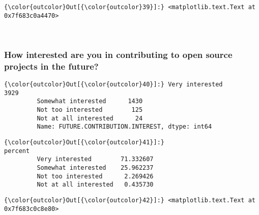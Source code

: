 \documentclass[11pt]{article}
\begin{document}
            \begin{Verbatim}[commandchars=\\\{\}]
{\color{outcolor}Out[{\color{outcolor}39}]:} <matplotlib.text.Text at 0x7f683c0a4470>
\end{Verbatim}
        
    \begin{center}
    \end{center}
    { \hspace*{\fill} \\}
    
    \subsubsection{How interested are you in contributing to open source
projects in the
future?}\label{how-interested-are-you-in-contributing-to-open-source-projects-in-the-future}


            \begin{Verbatim}[commandchars=\\\{\}]
{\color{outcolor}Out[{\color{outcolor}40}]:} Very interested          3929
         Somewhat interested      1430
         Not too interested        125
         Not at all interested      24
         Name: FUTURE.CONTRIBUTION.INTEREST, dtype: int64
\end{Verbatim}
        

            \begin{Verbatim}[commandchars=\\\{\}]
{\color{outcolor}Out[{\color{outcolor}41}]:}                          percent
         Very interested        71.332607
         Somewhat interested    25.962237
         Not too interested      2.269426
         Not at all interested   0.435730
\end{Verbatim}
        

            \begin{Verbatim}[commandchars=\\\{\}]
{\color{outcolor}Out[{\color{outcolor}42}]:} <matplotlib.text.Text at 0x7f683c0c8e80>
\end{Verbatim}
        
    \begin{center}
    \end{center}
    { \hspace*{\fill} \\}
    
\end{document}

